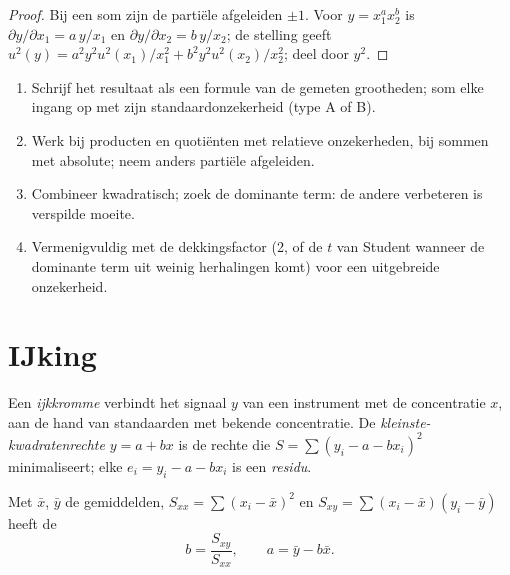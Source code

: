 \begin{proof}
Bij een som zijn de partiële afgeleiden $\pm1$. Voor $y = x_1^ax_2^b$ is $\partial y/\partial x_1 =
a\,y/x_1$ en $\partial y/\partial x_2 = b\,y/x_2$; de stelling geeft $u^2(y) = a^2y^2u^2(x_1)/x_1^2 +
b^2y^2u^2(x_2)/x_2^2$; deel door $y^2$.
\end{proof}

\begin{method}[Voortplanten]\label{met:b2:measurement-statistics:propagate}
\begin{enumerate}
  \item Schrijf het resultaat als een formule van de gemeten grootheden; som elke ingang op met zijn
        standaardonzekerheid (type A of B).
  \item Werk bij producten en quotiënten met relatieve onzekerheden, bij sommen met absolute;
        neem anders partiële afgeleiden.
  \item Combineer kwadratisch; zoek de dominante term: de andere verbeteren is verspilde moeite.
  \item Vermenigvuldig met de dekkingsfactor (2, of de $t$ van Student wanneer de dominante term uit weinig
        herhalingen komt) voor een uitgebreide onzekerheid.
\end{enumerate}
\end{method}

\section{IJking}

\begin{definition}[IJkkromme]\label{def:b2:measurement-statistics:calibration}
Een \emph{ijkkromme} verbindt het signaal $y$ van een instrument met de
concentratie $x$, aan de hand van standaarden met bekende concentratie. De \emph{kleinste-kwadratenrechte}
$y = a + bx$ is de rechte die $S = \sum (y_i - a -
bx_i)^2$ minimaliseert; elke $e_i = y_i - a - bx_i$ is een \emph{residu}.
\end{definition}

\begin{theorem}\label{thm:b2:measurement-statistics:least-squares}
Met $\bar x$, $\bar y$ de gemiddelden, $S_{xx} = \sum(x_i - \bar x)^2$ en $S_{xy} = \sum(x_i - \bar x)(y_i -
\bar y)$ heeft de 
\begin{equation*}
b = \frac{S_{xy}}{S_{xx}}, \qquad a = \bar y - b\bar x.
\end{equation*}
\end{theorem}

